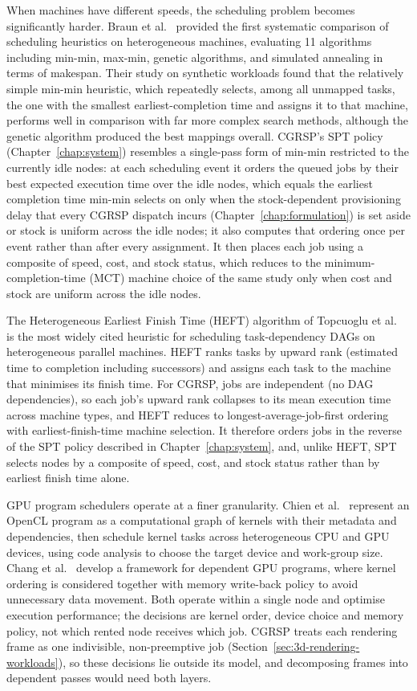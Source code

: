 When machines have different speeds, the scheduling problem becomes significantly harder. Braun et al.~\cite{braun2001comparison} provided the first systematic comparison of scheduling heuristics on heterogeneous machines, evaluating 11 algorithms including min-min, max-min, genetic algorithms, and simulated annealing in terms of makespan. Their study on synthetic workloads found that the relatively simple min-min heuristic, which repeatedly selects, among all unmapped tasks, the one with the smallest earliest-completion time and assigns it to that machine, performs well in comparison with far more complex search methods, although the genetic algorithm produced the best mappings overall. CGRSP's SPT policy (Chapter~\ref{chap:system}) resembles a single-pass form of min-min restricted to the currently idle nodes: at each scheduling event it orders the queued jobs by their best expected execution time over the idle nodes, which equals the earliest completion time min-min selects on only when the stock-dependent provisioning delay that every CGRSP dispatch incurs (Chapter~\ref{chap:formulation}) is set aside or stock is uniform across the idle nodes; it also computes that ordering once per event rather than after every assignment. It then places each job using a composite of speed, cost, and stock status, which reduces to the minimum-completion-time (MCT) machine choice of the same study only when cost and stock are uniform across the idle nodes.

The Heterogeneous Earliest Finish Time (HEFT) algorithm of Topcuoglu et al.~\cite{topcuoglu2002heft} is the most widely cited heuristic for scheduling task-dependency DAGs on heterogeneous parallel machines. HEFT ranks tasks by upward rank (estimated time to completion including successors) and assigns each task to the machine that minimises its finish time. For CGRSP, jobs are independent (no DAG dependencies), so each job's upward rank collapses to its mean execution time across machine types, and HEFT reduces to longest-average-job-first ordering with earliest-finish-time machine selection. It therefore orders jobs in the reverse of the SPT policy described in Chapter~\ref{chap:system}, and, unlike HEFT, SPT selects nodes by a composite of speed, cost, and stock status rather than by earliest finish time alone.

GPU program schedulers operate at a finer granularity. Chien et al.~\cite{chien2018graph} represent an OpenCL program as a computational graph of kernels with their metadata and dependencies, then schedule kernel tasks across heterogeneous CPU and GPU devices, using code analysis to choose the target device and work-group size. Chang et al.~\cite{chang2020dependent} develop a framework for dependent GPU programs, where kernel ordering is considered together with memory write-back policy to avoid unnecessary data movement. Both operate within a single node and optimise execution performance; the decisions are kernel order, device choice and memory policy, not which rented node receives which job. CGRSP treats each rendering frame as one indivisible, non-preemptive job (Section~\ref{sec:3d-rendering-workloads}), so these decisions lie outside its model, and decomposing frames into dependent passes would need both layers.

